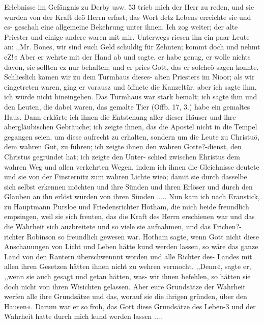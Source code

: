 Erlebnisse im Gefängnis zu Derby usw. 53
trieb mich der Herr zu reden, und sie wurden von der Kraft deö
Herrn erfast; das Wort detz Lebens erreichte sie und es- geschah
eine allgemeine Bekehrung unter ihnen.
Ich zog weiter; der alte Priester und einige andere waren
mit mir. Unterwegs riesen ihn ein paar Leute an: ,,Mr. Bones,
wir sind euch Geld schuldig für Zehnten; kommt doch und nehmt
eZ!« Aber er wehrte mit der Hand ab und sagte, er habe genug,
er wolle nichts davon, sie sollten ez nur behalten; und er pries
Gott, das er solcheö sagen konnte. Schlieslich kamen wir zu dem
Turmhaus dieses- alten Priesters im Nioor; als wir eingetreten
waren, ging er vorausz und öffnete die Kanzeltür, aber ich sagte ihm,
ich würde nicht hineingehen. Das Turmhaus war stark bemalt;
ich sagte ihm und den Leuten, die dabei waren, das gemalte Tier
(Offb. 17, 3.) habe ein gemaltes Haus. Dann erklärte ich ihnen die
Entstehung aller dieser Häuser und ihre abergläubischen Gebräuche;
ich zeigte ihnen, das die Apostel nicht in die Tempel gegangen
seien, um diese aufrecht zu erhalten, sondern um die Leute zu
Christuö, dem wahren Gut, zu führen; ich zeigte ihnen den wahren
Gotte?-dienst, den Christus gegründet hat; ich zeigte den Unter-
schied zwischen Ehristus dem wahren Weg und allen verkehrten
Wegen, indem ich ihnen die Gleichnisse deutete und sie von der
Finsternitz zum wahren Lichte wieö; damit sie durch dasselbe sich
selbst erkennen möchten und ihre Sünden und ihren Erlöser und
durch den Glauben an ihn erlöst würden von ihren Sünden .....
Nun kam ich nach Eranstick, zu Hauptmann Pursloe und
Friedensrichter Hotham, die mich beide freundlich empsingen, weil
sie sich freuten, das die Kraft des Herrn erschienen war und das
die Wahrheit sich auzbreitete und so viele sie aufnahmen, und das
Frichen?-richter Robinson so freundlich gewesen war. Hotham
sagte, wenn Gott nicht diese Anschauungen von Licht und Leben
hätte kund werden lassen, so wäre das ganze Land von den
Rantern überschwennnt worden und alle Richter des- Landes mit
allen ihren Gesetzen hätten ihnen nicht zu wehren vermocht. ,,Denn«,
sagte er, ,,wenn sie auch gesagt und getan hätten, was- wir ihnen
befehlen, so hätten sie doch nicht von ihren Wisichten gelassen.
Aber eure Grundsätze der Wahrheit werfen alle ihre Grundsätze
und das, worauf sie die ihrigen gründen, über den Hausen«.
Darum war er so froh, das Gott diese Grundsätze des Leben-3
und der Wahrheit hatte durch mich kund werden lassen ....


